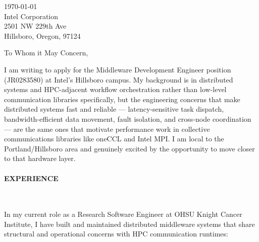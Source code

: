 



\textcolor{my-grey}{\dotfill}
\bigbreak

{\today}\\
Intel Corporation\\
2501 NW 229th Ave\\
Hillsboro, Oregon, 97124

\vspace*{2\baselineskip}

To Whom it May Concern,

\vspace*{\baselineskip}

I am writing to apply for the Middleware Development Engineer position (JR0283580) at Intel's Hillsboro campus. My background is in distributed systems and HPC-adjacent workflow orchestration rather than low-level communication libraries specifically, but the engineering concerns that make distributed systems fast and reliable --- latency-sensitive task dispatch, bandwidth-efficient data movement, fault isolation, and cross-node coordination --- are the same ones that motivate performance work in collective communications libraries like oneCCL and Intel MPI. I am local to the Portland/Hillsboro area and genuinely excited by the opportunity to move closer to that hardware layer.

\paragraph{EXPERIENCE}\

\vspace*{\baselineskip}

In my current role as a Research Software Engineer at OHSU Knight Cancer Institute, I have built and maintained distributed middleware systems that share structural and operational concerns with HPC communication runtimes:

